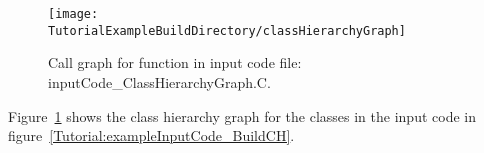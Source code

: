 \begin{figure}
\texttt{[image: \\TutorialExampleBuildDirectory/classHierarchyGraph]}
\caption{Call graph for function in input code file: inputCode\_ClassHierarchyGraph.C.}
\label{Tutorial:exampleBuildCHGraph}
\end{figure}

   Figure~\ref{Tutorial:exampleBuildCHGraph} shows the class hierarchy graph for the
classes in the input code in figure~\ref{Tutorial:exampleInputCode_BuildCH}.



